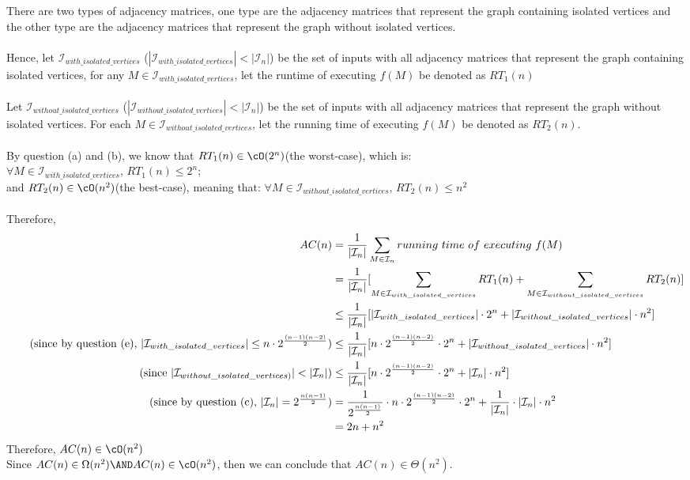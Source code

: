 \documentclass[12pt]{article}
\begin{document}
There are two types of adjacency matrices, one type are the adjacency matrices that represent the graph containing isolated vertices and the other type are the adjacency matrices that represent the graph without isolated vertices.\\
\\
Hence, let $\mathcal{I}_{with\_isolated\_vertices}$ ($|\mathcal{I}_{with\_isolated\_vertices}|<|\mathcal{I}_n|$) be the set of inputs with all adjacency matrices that represent the graph containing isolated vertices, for any $M \in \mathcal{I}_{with\_isolated\_vertices}$, let the runtime of executing $f(M)$ be denoted as $RT_1(n)$\\
\\
Let $\mathcal{I}_{without\_isolated\_vertices}$ ($|\mathcal{I}_{without\_isolated\_vertices}|<|\mathcal{I}_n|$) be the set of inputs with all adjacency matrices that represent the graph without isolated vertices. For each $M \in \mathcal{I}_{without\_isolated\_vertices}$, let the running time of executing $f(M)$ be denoted as $RT_2(n)$.\\
\\
By question (a) and (b), we know that $RT_1(n)\in \cO(2^n)$(the worst-case), which is: \\
$\forall M \in \mathcal{I}_{with\_isolated\_vertices}$, $RT_1(n) \le 2^n$;\\
and $RT_2(n)\in \cO(n^2)$(the best-case), meaning that: $\forall M \in \mathcal{I}_{without\_isolated\_vertices}$, $RT_2(n) \le n^2$\\
\\
Therefore,
\begin{align*}
    AC(n) &= \frac{1}{|\mathcal{I}_n|}\sum_{M\in \mathcal{I}_n}running\  time\ of\ executing\ f(M)\\
    &= \frac{1}{|\mathcal{I}_n|}[\sum_{M\in \mathcal{I}_{with\_isolated\_vertices}}RT_1(n) + \sum_{M\in \mathcal{I}_{without\_isolated\_vertices}}RT_2(n)]\\
    &\le \frac{1}{|\mathcal{I}_n|}[|\mathcal{I}_{with\_isolated\_vertices}|\cdot 2^n+|\mathcal{I}_{without\_isolated\_vertices}|\cdot n^2]\\
    \tag{since by question (e), $|\mathcal{I}_{with\_isolated\_vertices}|\le n\cdot  2^{\frac{(n-1)(n-2)}{2}}$}
    &\le \frac{1}{|\mathcal{I}_n|}[n\cdot 2^{\frac{(n-1)(n-2)}{2}}\cdot 2^n+|\mathcal{I}_{without\_isolated\_vertices}|\cdot n^2]\\
    \tag{since $|\mathcal{I}_{without\_isolated\_vertices)}|<|\mathcal{I}_n|$}
    &\le \frac{1}{|\mathcal{I}_n|}[n\cdot 2^{\frac{(n-1)(n-2)}{2}}\cdot 2^n+|\mathcal{I}_{n}|\cdot n^2]\\
    \tag{since by question (c), $|\mathcal{I}_n|=2^{\frac{n(n-1)}{2}}$}
    &= \frac{1}{2^{\frac{n(n-1)}{2}}}\cdot n\cdot 2^{\frac{(n-1)(n-2)}{2}}\cdot 2^n + \frac{1}{|\mathcal{I}_n|}\cdot |\mathcal{I}_n|\cdot n^2\\
    &= 2n+n^2
\end{align*}
Therefore, $AC(n)\in \cO(n^2)$\\
Since $AC(n)\in \Omega(n^2) \AND AC(n)\in \cO(n^2)$, then we can conclude that $AC(n) \in \Theta(n^2)$.
\end{document}
